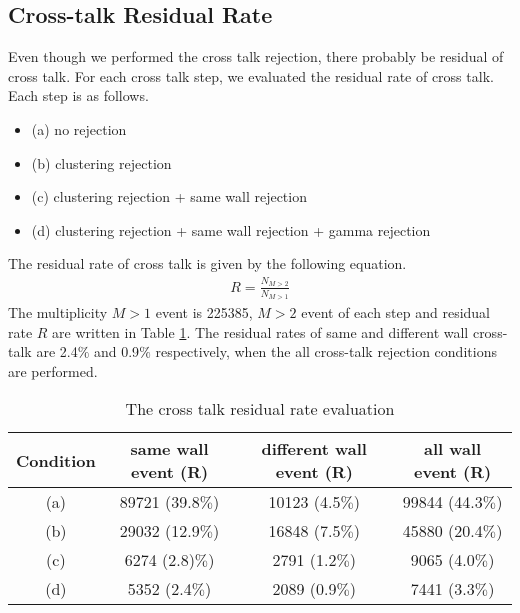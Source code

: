 \subsection{Cross-talk Residual Rate}
Even though we performed the cross talk rejection, there probably be residual of cross talk. For each cross talk step, we evaluated the residual rate of cross talk. Each step is as follows.
\begin{itemize}
    \item (a) no rejection
    \item (b) clustering rejection
    \item (c) clustering rejection + same wall rejection
    \item (d) clustering rejection + same wall rejection + gamma rejection
\end{itemize}
The residual rate of cross talk is given by the following equation.
\begin{align}
    R = \frac{N_{M>2}}{N_{M>1}}
\end{align}
The multiplicity $M>1$ event is 225385, $M>2$ event of each step and residual rate $R$ are written in Table \ref{cross-talk_residue}. The residual rates of same and different wall cross-talk are 2.4$\%$ and 0.9$\%$ respectively, when the all cross-talk rejection conditions are performed.
\begin{table}[h]
    \centering
    \begin{tabular}[h]{c|c|c|c}
        \hline
        Condition & same wall event (R) & different wall event (R) & all wall event (R)\\
        \hline
        (a) & 89721 (39.8$\%$) & 10123 (4.5$\%$) & 99844 (44.3$\%$) \\
        (b) & 29032 (12.9$\%$) & 16848 (7.5$\%$) & 45880 (20.4$\%$)\\
        (c) & 6274 (2.8)$\%$) & 2791 (1.2$\%$)& 9065 (4.0$\%$)\\
        (d) & 5352 (2.4$\%$)& 2089 (0.9$\%$)& 7441 (3.3$\%$)\\
        \hline
    \end{tabular}
    \caption{The cross talk residual rate evaluation}
    \label{cross-talk_residue}
\end{table}

